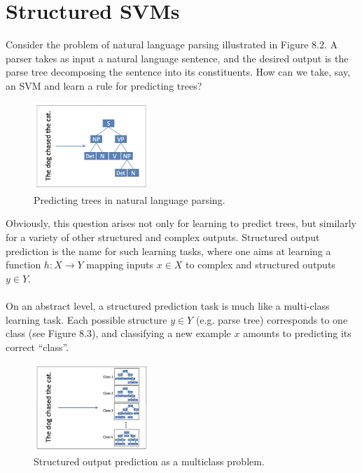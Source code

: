\documentclass[twoside]{article}
\begin{document}
\section{Structured SVMs}
Consider the problem of natural language parsing illustrated in Figure 8.2. A parser takes as input a natural
language sentence, and the desired output is the parse tree
decomposing the sentence into its constituents. How can we take, say,
an SVM and learn a rule for predicting trees?

\begin{figure}[h]
\caption{Predicting trees in natural language parsing.}
\centering
\includegraphics[width=0.39\textwidth]{img/syn_tree.png}
\end{figure}


Obviously, this question arises not only for learning to
predict trees, but similarly for a variety of other structured
and complex outputs. Structured output prediction is the
name for such learning tasks, where one aims at learning
a function $h : X \rightarrow Y$ mapping inputs $x \in X$ to complex
and structured outputs $y \in Y$. 
\\ \\ On an abstract level, a structured prediction task is much like
a multi-class learning task. Each possible structure $y \in Y$
(e.g. parse tree) corresponds to one class (see Figure 8.3), and
classifying a new example $x$ amounts to predicting its correct
“class”. 

\begin{figure}[h]
\caption{Structured output prediction as a multiclass problem.}
\centering
\includegraphics[width=0.39\textwidth]{img/syn_out.png}
\end{figure}
\end{document}
